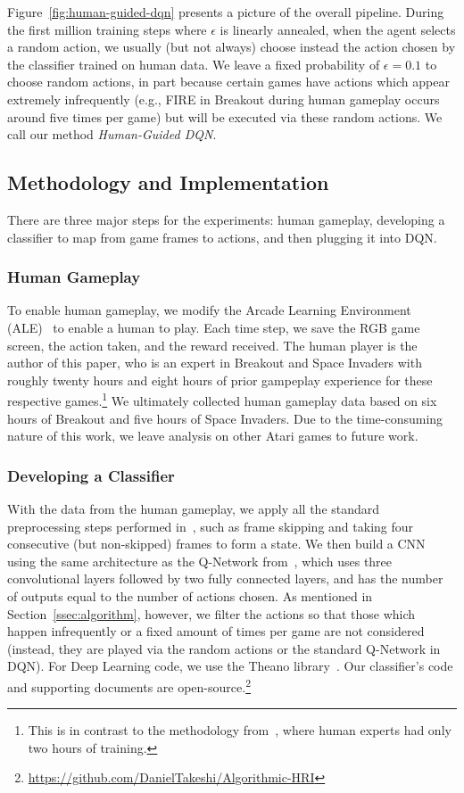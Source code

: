 \documentclass[letterpaper, 10pt, conference]{ieeeconf}
\begin{document}
Figure~\ref{fig:human-guided-dqn} presents a picture of the overall pipeline.
During the first million training steps where $\epsilon$ is linearly annealed,
when the agent selects a random action, we usually (but not always) choose
instead the action chosen by the classifier trained on human data. We leave a
fixed probability of $\epsilon=0.1$ to choose random actions, in part because
certain games have actions which appear extremely infrequently (e.g., FIRE in
Breakout during human gameplay occurs around five times per game) but will be
executed via these random actions. We call our method \emph{Human-Guided DQN}.

\subsection{Methodology and Implementation}\label{ssec:implementation}

There are three major steps for the experiments: human gameplay, developing a
classifier to map from game frames to actions, and then plugging it into DQN. 

\subsubsection{Human Gameplay} To enable human gameplay, we modify the Arcade
Learning Environment (ALE)~\cite{bellemare13arcade} to enable a human to play.
Each time step, we save the RGB game screen, the action taken, and the reward
received. The human player is the author of this paper, who is an expert in
Breakout and Space Invaders with roughly twenty hours and eight hours of prior
gampeplay experience for these respective games.\footnote{This is in contrast to
the methodology from~\cite{mnih-dqn-2015}, where human experts had only two
hours of training.} We ultimately collected human gameplay data based on six
hours of Breakout and five hours of Space Invaders. Due to the time-consuming
nature of this work, we leave analysis on other Atari games to future work.

\subsubsection{Developing a Classifier} With the data from the human gameplay,
we apply all the standard preprocessing steps performed in~\cite{mnih-dqn-2015},
such as frame skipping and taking four consecutive (but non-skipped) frames to
form a state. We then build a CNN using the same architecture as the Q-Network
from~\cite{mnih-dqn-2015}, which uses three convolutional layers followed by two
fully connected layers, and has the number of outputs equal to the number of
actions chosen. As mentioned in Section~\ref{ssec:algorithm}, however, we filter
the actions so that those which happen infrequently or a fixed amount of times
per game are not considered (instead, they are played via the random actions or
the standard Q-Network in DQN). For Deep Learning code, we use the Theano
library~\cite{2016arXiv160502688short}.  Our classifier's code and supporting
documents are
open-source.\footnote{\url{https://github.com/DanielTakeshi/Algorithmic-HRI}}
\end{document}
